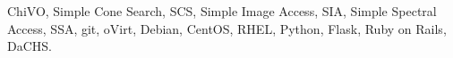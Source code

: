 \thispagestyle{empty}
\maketitle

\vspace{0.5cm}



\vspace{0.4cm}

\begin{keywords}
	ChiVO, Simple Cone Search, SCS, Simple Image Access, SIA, Simple Spectral Access, SSA, git, oVirt, Debian, CentOS, RHEL, Python, Flask, Ruby on Rails, DaCHS.
\end{keywords}

\vspace{1cm}

